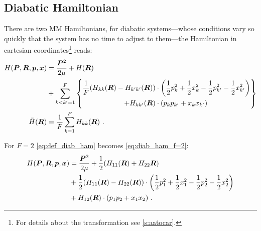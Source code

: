 \subsection{Diabatic Hamiltonian}\label{s:dh}
%
There are two MM Hamiltonians, for diabatic systems---whose conditions vary so quickly that the system has no time to adjust to them---the Hamiltonian in cartesian coordinates\footnote{For details about the transformation see \cref{s:aatocar}.} reads:
\begin{subequations}\label{eq:def_diab_ham}
\begin{align}
H(\bm{P}, \bm{R}, \bm{p}, \bm{x}) & =\frac{\bm{P}^{2}}{2\mu}+\bar{H}(\bm{R}) 
\nonumber\\
& +\sum\limits_{k<k'=1}^{F}
\left\{\begin{aligned}
\frac{1}{F} (H_{kk}(\bm{R})-H_{k'k'}(\bm{R}))&\cdot\left(
\frac{1}{2}p_{k}^{2}+\frac{1}{2}x_{k}^{2}-\frac{1}{2}p_{k'}^{2}-\frac{1}{2}x_{k'}^{2}\right)\\
+H_{kk'}(\bm{R})&\cdot(p_{k}p_{k'}+x_{k}x_{k'})
\end{aligned}\right\}\\
\bar{H}(\bm{R}) &= \frac{1}{F}\sum\limits_{k=1}^{F}H_{kk}(\bm{R})~.
\end{align}
\end{subequations}

For $ F=2 $ \cref{eq:def_diab_ham} becomes \cref{eq:diab_ham_f=2}:
\begin{align}\label{eq:diab_ham_f=2}
H(\bm{P}, \bm{R}, \bm{p}, \bm{x})
&=\frac{\bm{P}^{2}}{2\mu}+\frac{1}{2}(H_{11}(\bm{R})+H_{22}\bm{R})\nonumber\\
&+\frac{1}{2}(H_{11}(\bm{R})-H_{22}(\bm{R}))\cdot\left(\frac{1}{2}p_{1}^{2}+\frac{1}{2}x_{1}^{2}-\frac{1}{2}p_{2}^{2}-\frac{1}{2}x_{2}^{2}\right)\nonumber\\
&+H_{12}(\bm{R})\cdot(p_{1}p_{2}+x_{1}x_{2})~.
\end{align}
%

